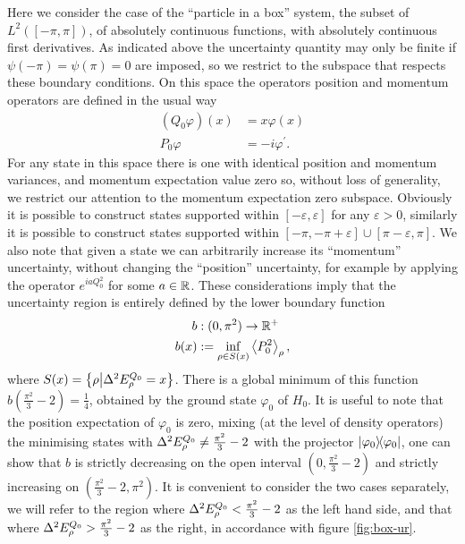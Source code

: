 Here we consider the case of the ``particle in a box'' system, the subset of $L^2([-\pi,\pi])$, of absolutely continuous functions, with absolutely continuous first derivatives. As indicated above the uncertainty quantity may only be finite if  $\psi(-\pi) = \psi(\pi) = 0$ are imposed, so we restrict to the subspace that respects these boundary conditions. On this space the operators position and momentum operators are defined in the usual way
\begin{align}
  (Q_0 \varphi)(x) &= x \varphi(x)\\
  P_0\varphi &= -i \varphi^\prime.
\end{align}
For any state in this space there is one with identical position and momentum variances, and momentum expectation value zero so, without loss of generality, we restrict our attention to the momentum expectation zero subspace. Obviously it is possible to construct states supported within $[-\varepsilon, \varepsilon]$ for any $\varepsilon>0$, similarly it is possible to construct states supported within $[-\pi, -\pi+\varepsilon]\cup [\pi-\varepsilon, \pi]$. We also note that given a state we can arbitrarily increase its ``momentum'' uncertainty, without changing the ``position'' uncertainty, for example by applying the operator $e^{i a Q_0^2}$ for some $a\in\mathbb{R}$. These considerations imply that the uncertainty region is entirely defined by the lower boundary function
\begin{align}
  b&:(0,\pi^2)\to \mathbb{R}^+\\
  b(x) &:= \inf_{\rho\in S(x)} \left\langle P_0^2\right\rangle_\rho,
\end{align}
where $S(x) = \left\{\rho\middle|\var{E^{Q_0}_\rho} = x \right\}$. There is a global minimum of this function $b\left(\frac{\pi^2}{3} -2\right) = \frac{1}{4}$, obtained by the ground state $\varphi_0$ of $H_0$. It is useful to note that the position expectation of $\varphi_0$ is zero, mixing (at the level of density operators) the minimising states with $\var{E^{Q_0}_\rho}\neq\frac{\pi^2}{3} -2$ with the projector $|\varphi_0\rangle\!\langle\varphi_0|$, one can show that $b$ is strictly decreasing on the open interval $\left(0,\frac{\pi^2}{3} -2\right)$ and strictly increasing on $\left(\frac{\pi^2}{3} -2,\pi^2\right)$. It is convenient to consider the two cases separately, we will refer to the region where $\var{E^{Q_0}_\rho} < \frac{\pi^2}{3} -2$ as the left hand side, and that where $\var{E^{Q_0}_\rho} > \frac{\pi^2}{3} -2$ as the right, in accordance with figure \ref{fig:box-ur}.

